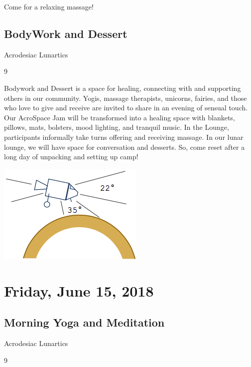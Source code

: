 \begin{multicols}{2}
{Come for a relaxing massage!


\subsection*{BodyWork and Dessert}
\begin{description}[leftmargin=6em,noitemsep,style=nextline]
	\item[Camp:] Acrodesiac Lunartics
  \item[Times:] 9\pm
\end{description}

Bodywork and Dessert is a space for healing, connecting with and supporting others in our community. Yogis, massage therapists, unicorns, fairies, and those who love to give and receive are invited to share in an evening of sensual touch. Our AcroSpace Jam will be transformed into a healing space with blankets, pillows, mats, bolsters, mood lighting, and tranquil music. In the Lounge, participants informally take turns offering and receiving massage. In our lunar lounge, we will have space for conversation and desserts. So, come reset after a long day of unpacking and setting up camp! }

\begin{center}
	\includegraphics[width=.6\columnwidth]{images/landing3}
\end{center}

\columnbreak
\section*{Friday, June 15, 2018}
\subsection*{Morning Yoga and Meditation}
\begin{description}[leftmargin=6em,noitemsep,style=nextline]
	\item[Camp:] Acrodesiac Lunartics
  \item[Times:] 9\am
\end{description}


\end{multicols}
